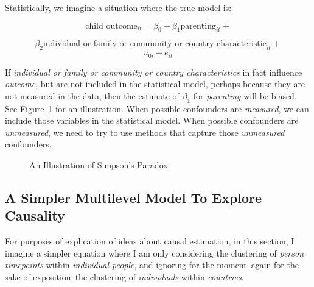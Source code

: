 \documentclass[
  letterpaper,
  DIV=11,
  numbers=noendperiod]{scrreprt}
\begin{document}
Statistically, we imagine a situation where the true model is:

\[\text{child outcome}_{it} = \beta_0 + \beta_1 \text{parenting}_{it} +\]

\[\beta_2 \text{individual or family or community or country characteristic}_{it} + \]
\[u_{0i} + e_{it}\]

If \emph{individual or family or community or country characteristics}
in fact influence \emph{outcome}, but are not included in the
statistical model, perhaps because they are not measured in the data,
then the estimate of \(\beta_1\) for \emph{parenting} will be biased.
See Figure~\ref{fig-Simpson} for an illustration. When possible
confounders are \emph{measured}, we can include those variables in the
statistical model. When possible confounders are \emph{unmeasured}, we
need to try to use methods that capture those \emph{unmeasured}
confounders.

\begin{figure}


\caption{\label{fig-Simpson}An Illustration of Simpson's Paradox}

\end{figure}%

\subsection{A Simpler Multilevel Model To Explore
Causality}\label{a-simpler-multilevel-model-to-explore-causality}

For purposes of explication of ideas about causal estimation, in this
section, I imagine a simpler equation where I am only considering the
clustering of \emph{person timepoints} within \emph{individual people},
and ignoring for the moment--again for the sake of exposition--the
clustering of \emph{individuals} within \emph{countries}.
\end{document}
